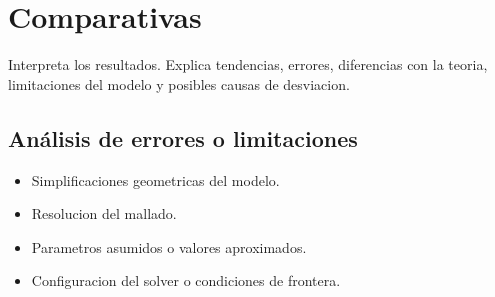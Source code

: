 \chapter{Comparativas}
Interpreta los resultados. Explica tendencias, errores, diferencias con la teoria, limitaciones del modelo y posibles causas de desviacion.

\section{Análisis de errores o limitaciones}
\begin{itemize}
    \item Simplificaciones geometricas del modelo.
    \item Resolucion del mallado.
    \item Parametros asumidos o valores aproximados.
    \item Configuracion del solver o condiciones de frontera.
\end{itemize}
